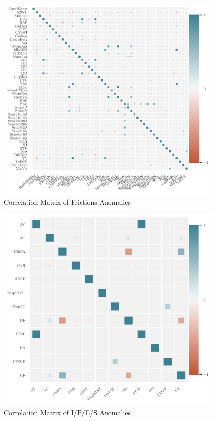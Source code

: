 	\begin{center}
		\begin{figure}
			\includegraphics[width=\textwidth,height=\textheight,keepaspectratio]{Figures/corrplot_frictions.pdf}
			\caption{Correlation Matrix of Frictions Anomalies}
			\label{fig:corrplot_frictions}
		\end{figure}
	\end{center}
	
	
	\begin{center}
		\begin{figure}
			\includegraphics{Figures/corrplot_ibes.pdf}
			\caption{Correlation Matrix of I/B/E/S Anomalies}
			\label{fig:corrplot_ibes}
		\end{figure}
	\end{center}
	
